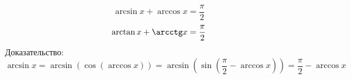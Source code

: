 \documentclass{article}
\begin{document}
\begin{figure}[h]
\begin{minipage}[h]{0.49\linewidth}
\end{minipage}
\begin{minipage}[h]{0.49\linewidth}
\end{minipage}
\label{ris:image1}
\end{figure}
\[ \arcsin x + \arccos x = \frac{\pi}{2} \]
\[ \arctan x + \arcctg x = \frac{\pi}{2} \]
Доказательство:
\[ \arcsin x = \arcsin (\cos (\arccos x)) = \arcsin (\sin (\frac{\pi}{2} - \arccos x))
= \frac{\pi}{2} - \arccos x\]
\end{document}

